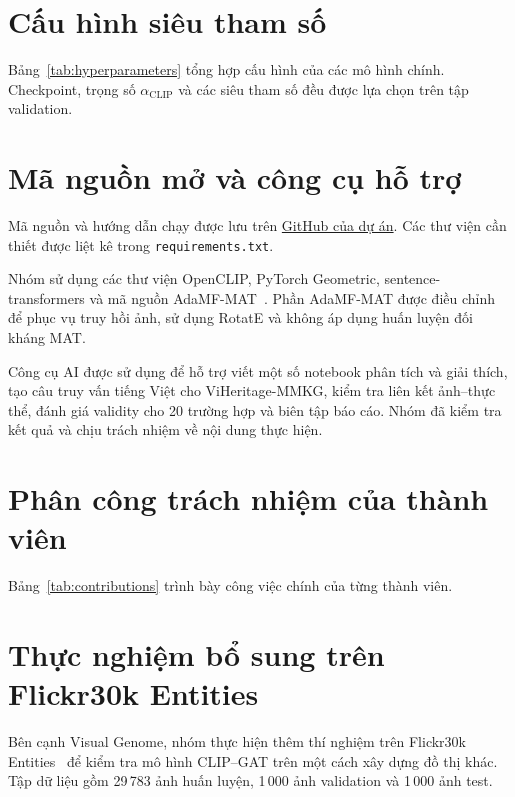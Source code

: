 \section{Cấu hình siêu tham số}
\label{app:hyperparameters}

Bảng~\ref{tab:hyperparameters} tổng hợp cấu hình của các mô hình chính. Checkpoint, trọng số $\alpha_{\mathrm{CLIP}}$ và các siêu tham số đều được lựa chọn trên tập validation.

\section{Mã nguồn mở và công cụ hỗ trợ}
\label{app:tools}

Mã nguồn và hướng dẫn chạy được lưu trên \href{https://github.com/nghiep2405/GML-K35-PROJECT3-MultimodalXAI}{GitHub của dự án}. Các thư viện cần thiết được liệt kê trong \texttt{requirements.txt}.

Nhóm sử dụng các thư viện OpenCLIP, PyTorch Geometric, sentence-transformers và mã nguồn AdaMF-MAT~\cite{adamfmat2024}. Phần AdaMF-MAT được điều chỉnh để phục vụ truy hồi ảnh, sử dụng RotatE và không áp dụng huấn luyện đối kháng MAT.

Công cụ AI được sử dụng để hỗ trợ viết một số notebook phân tích và giải thích, tạo câu truy vấn tiếng Việt cho ViHeritage-MMKG, kiểm tra liên kết ảnh--thực thể, đánh giá validity cho 20 trường hợp và biên tập báo cáo. Nhóm đã kiểm tra kết quả và chịu trách nhiệm về nội dung thực hiện.

\section{Phân công trách nhiệm của thành viên}
\label{app:contributions}

Bảng~\ref{tab:contributions} trình bày công việc chính của từng thành viên.

\begin{table}[!t]
  \renderhyperparameterstable
  \vspace{6pt}
  \rendercontributionstable
\end{table}

\section{Thực nghiệm bổ sung trên Flickr30k Entities}
\label{app:flickr30k-pipeline}

Bên cạnh Visual Genome, nhóm thực hiện thêm thí nghiệm trên Flickr30k Entities~\cite{plummer2017flickr30k} để kiểm tra mô hình CLIP--GAT trên một cách xây dựng đồ thị khác. Tập dữ liệu gồm 29\,783 ảnh huấn luyện, 1\,000 ảnh validation và 1\,000 ảnh test.

